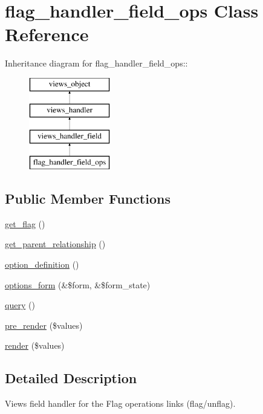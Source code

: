 \hypertarget{classflag__handler__field__ops}{
\section{flag\_\-handler\_\-field\_\-ops Class Reference}
\label{classflag__handler__field__ops}
}
Inheritance diagram for flag\_\-handler\_\-field\_\-ops::\begin{figure}[H]
\begin{center}
\leavevmode
\includegraphics[height=4cm]{classflag__handler__field__ops}
\end{center}
\end{figure}
\subsection*{Public Member Functions}
\begin{CompactItemize}
\item 
\hyperlink{classflag__handler__field__ops_378ce25780095e34a818eabe862d61a9}{get\_\-flag} ()
\item 
\hyperlink{classflag__handler__field__ops_bd0b18279699026a09a1b8d21142d696}{get\_\-parent\_\-relationship} ()
\item 
\hyperlink{classflag__handler__field__ops_05750d85d477c51b5fa267a75e245d5a}{option\_\-definition} ()
\item 
\hyperlink{classflag__handler__field__ops_88b37806cdb2d420b830d0030ef7028a}{options\_\-form} (\&\$form, \&\$form\_\-state)
\item 
\hyperlink{classflag__handler__field__ops_a42722b03427da1e009f3b6075af703a}{query} ()
\item 
\hyperlink{classflag__handler__field__ops_5ad942714340d84d5462f3fd928a230c}{pre\_\-render} (\$values)
\item 
\hyperlink{classflag__handler__field__ops_3732dd37e3011699c7489e02e2aa3655}{render} (\$values)
\end{CompactItemize}


\subsection{Detailed Description}
Views field handler for the Flag operations links (flag/unflag). 

